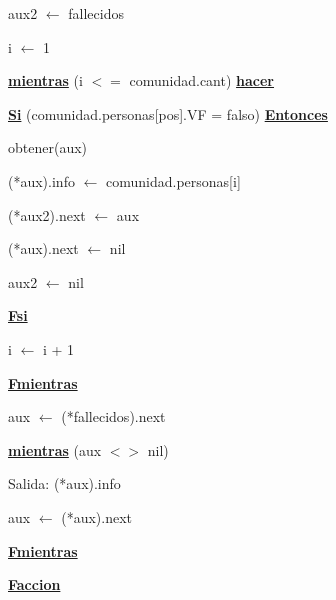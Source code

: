 \documentclass{article}
\begin{document}
            \hspace{12mm}aux2 $\leftarrow$ fallecidos

            \hspace{12mm}i $\leftarrow$ 1

            \hspace{12mm}\underline{\textbf{mientras}} (i $<=$ comunidad.cant) \underline{\textbf{hacer}}

                \hspace{16mm}\underline{\textbf{Si}} (comunidad.personas[pos].VF = falso) \underline{\textbf{Entonces}}

                    \hspace{20mm}obtener(aux)

                    \hspace{20mm}(*aux).info $\leftarrow$ comunidad.personas[i]

                    \hspace{20mm}(*aux2).next $\leftarrow$ aux

                    \hspace{20mm}(*aux).next $\leftarrow$ nil

                    \hspace{20mm}aux2 $\leftarrow$ nil

                \hspace{16mm}\underline{\textbf{Fsi}}

                \hspace{16mm}i $\leftarrow$ i + 1

            \hspace{12mm}\underline{\textbf{Fmientras}}

            \hspace{12mm}aux $\leftarrow$ (*fallecidos).next

            \hspace{12mm}\underline{\textbf{mientras}} (aux $<>$ nil)

                \hspace{16mm}Salida: (*aux).info

                \hspace{16mm}aux $\leftarrow$ (*aux).next

            \hspace{12mm}\underline{\textbf{Fmientras}}

    \hspace{4mm}\underline{\textbf{Faccion}}

    \vspace{4mm}
\end{document}
